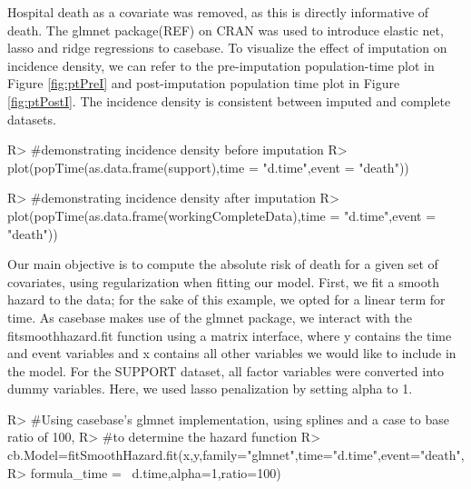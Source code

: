 \documentclass[
]{jss}
\begin{document}
Hospital death as a covariate was removed, as this is directly
informative of death. The glmnet package(REF) on CRAN was used to
introduce elastic net, lasso and ridge regressions to casebase. To
visualize the effect of imputation on incidence density, we can refer to
the pre-imputation population-time plot in Figure \ref{fig:ptPreI} and
post-imputation population time plot in Figure \ref{fig:ptPostI}. The
incidence density is consistent between imputed and complete datasets.

\begin{CodeChunk}

\begin{CodeInput}
R> #demonstrating incidence density before imputation
R> plot(popTime(as.data.frame(support),time = "d.time",event = "death"))
\end{CodeInput}
\end{CodeChunk}

\begin{CodeChunk}

\begin{CodeInput}
R> #demonstrating incidence density after imputation
R> plot(popTime(as.data.frame(workingCompleteData),time = "d.time",event = "death"))
\end{CodeInput}
\end{CodeChunk}

Our main objective is to compute the absolute risk of death for a given
set of covariates, using regularization when fitting our model. First,
we fit a smooth hazard to the data; for the sake of this example, we
opted for a linear term for time. As casebase makes use of the glmnet
package, we interact with the fitsmoothhazard.fit function using a
matrix interface, where y contains the time and event variables and x
contains all other variables we would like to include in the model. For
the SUPPORT dataset, all factor variables were converted into dummy
variables. Here, we used lasso penalization by setting alpha to 1.

\begin{CodeChunk}

\begin{CodeInput}
R> #Using casebase's glmnet implementation, using splines and a case to base ratio of 100,
R> #to determine the hazard function
R> cb.Model=fitSmoothHazard.fit(x,y,family="glmnet",time="d.time",event="death",
R>                              formula_time = ~d.time,alpha=1,ratio=100)
\end{CodeInput}
\end{CodeChunk}
\end{document}
